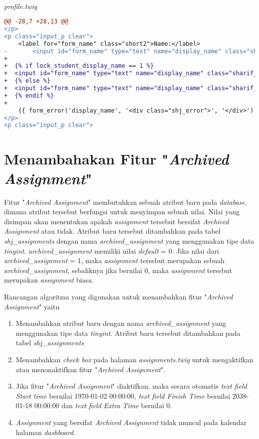 ~\\
\textit{profile.twig}
\begin{lstlisting}[language=diff, basicstyle=\ttfamily, frame=single,
columns=fullflexible, keepspaces=true, breaklines=true]
@@ -28,7 +28,13 @@
</p>
<p class="input_p clear">
	<label for="form_name" class="short2">Name:</label>
-       <input id="form_name" type="text" name="display_name" class="sharif_input medium" value="{{ display_name }}"/>
+
+  {% if lock_student_display_name == 1 %}
+  <input id="form_name" type="text" name="display_name" class="sharif_input medium" value="{{ display_name }}" disabled/>
+  {% else %}
+  <input id="form_name" type="text" name="display_name" class="sharif_input medium" value="{{ display_name }}"/>
+  {% endif %}
+
	{{ form_error('display_name', '<div class="shj_error">', '</div>') }}
</p>
<p class="input_p clear">
\end{lstlisting}

\section{Menambahakan Fitur "\textit{Archived Assignment}"}
\label{chap:arc}
Fitur "\textit{Archived Assignment}" membutuhkan sebuah atribut baru pada \textit{database}, dimana atribut tersebut berfungsi untuk menyimpan sebuah nilai. Nilai yang disimpan akan menentukan apakah \textit{assignment} tersebut bersifat \textit{Archived Assignment} atau tidak. Atribut baru tersebut  ditambahkan pada tabel \textit{shj\_assignments} dengan nama \textit{archived\_assignment} yang menggunakan tipe data \textit{tinyint}. \textit{archived\_assignment} memiliki nilai \textit{default} = 0. Jika nilai dari \textit{archived\_assignment} = 1, maka \textit{assignment} tersebut merupakan sebuah \textit{archived\_assignment}, sebaliknya jika bernilai 0, maka \textit{assignment} tersebut merupakan \textit{assignment} biasa.

Rancangan algoritma yang digunakan untuk menambahkan fitur "\textit{Archived Assignment}" yaitu
\begin{enumerate}
	\item Menambahkan atribut baru dengan nama \textit{archived\_assignment} yang menggunakan tipe data \textit{tinyint}. Atribut baru tersebut ditambahkan pada tabel \textit{shj\_assignments}
	\item Menambahkan \textit{check box} pada halaman \textit{assignments.twig} untuk mengaktifkan atau menonaktifkan fitur "\textit{Archived Assignment}".
	\item Jika fitur "\textit{Archived Assignment}" diaktifkan, maka secara otomatis \textit{text field Start time} bernilai 1970-01-02 00:00:00, \textit{text field Finish Time} bernilai 2038-01-18 00:00:00 dan \textit{text field Extra Time} bernilai 0.
	\item \textit{Assignment} yang bersifat \textit{Archived Assignment} tidak muncul pada kalendar halaman \textit{dashboard}.
\end{enumerate}

